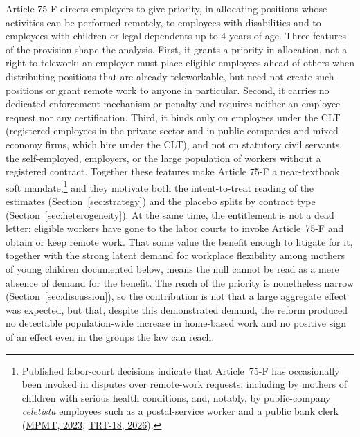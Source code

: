 \documentclass[12pt]{article}
\begin{document}
Article 75-F directs employers to give priority, in allocating positions whose activities can be performed remotely, to employees with disabilities and to employees with children or legal dependents up to 4 years of age. Three features of the provision shape the analysis. First, it grants a priority in allocation, not a right to telework: an employer must place eligible employees ahead of others when distributing positions that are already teleworkable, but need not create such positions or grant remote work to anyone in particular. Second, it carries no dedicated enforcement mechanism or penalty and requires neither an employee request nor any certification. Third, it binds only on employees under the CLT (registered employees in the private sector and in public companies and mixed-economy firms, which hire under the CLT), and not on statutory civil servants, the self-employed, employers, or the large population of workers without a registered contract. Together these features make Article 75-F a near-textbook soft mandate,\footnote{Published labor-court decisions indicate that Article~75-F has occasionally been invoked in disputes over remote-work requests, including by mothers of children with serious health conditions, and, notably, by public-company \emph{celetista} employees such as a postal-service worker and a public bank clerk (\href{https://mpmt.mp.br/portalcao/news/1013/130543/mae-com-filho-pequeno-ou-com-deficiencia-tem-prioridade-em-teletrabalho/916}{MPMT, 2023}; \href{https://www.trt18.jus.br/portal/escrituraria-obtem-teletrabalho-para-acompanhamento-de-filha-com-grave-alergia-alimentar/}{TRT-18, 2026}).} and they motivate both the intent-to-treat reading of the estimates (Section~\ref{sec:strategy}) and the placebo splits by contract type (Section~\ref{sec:heterogeneity}). At the same time, the entitlement is not a dead letter: eligible workers have gone to the labor courts to invoke Article~75-F and obtain or keep remote work. That some value the benefit enough to litigate for it, together with the strong latent demand for workplace flexibility among mothers of young children documented below, means the null cannot be read as a mere absence of demand for the benefit. The reach of the priority is nonetheless narrow (Section~\ref{sec:discussion}), so the contribution is not that a large aggregate effect was expected, but that, despite this demonstrated demand, the reform produced no detectable population-wide increase in home-based work and no positive sign of an effect even in the groups the law can reach.
\end{document}
